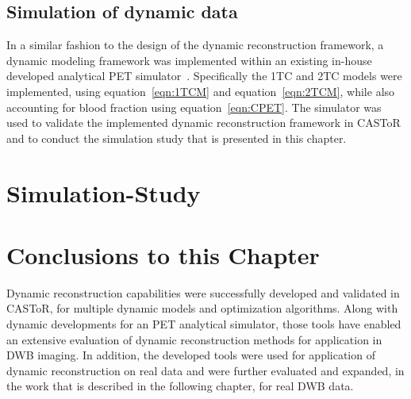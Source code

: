 \subsection{Simulation of dynamic data}
In a similar fashion to the design of the dynamic reconstruction framework, a dynamic modeling framework was implemented within an existing in-house developed analytical PET simulator~\cite{Stute2015}. Specifically the 1TC and 2TC models were implemented, using equation~\ref{eqn:1TCM} and equation~\ref{eqn:2TCM}, while also accounting for blood fraction using equation~\ref{eqn:CPET}.
The simulator was used to validate the implemented dynamic reconstruction framework in CASToR and to conduct the simulation study that is presented in this chapter.

\section{Simulation-Study}


\cleardoublepage





\section{Conclusions to this Chapter}
Dynamic reconstruction capabilities were successfully developed and validated in CASToR, for multiple dynamic models and optimization algorithms. Along with dynamic developments for an PET analytical simulator, those tools have enabled an extensive evaluation of dynamic reconstruction methods for application in DWB imaging. In addition, the developed tools were used for application of dynamic reconstruction on real data and were further evaluated and expanded, in the work that is described in the following chapter, for real DWB data.